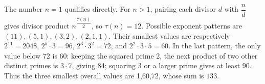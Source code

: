 The number $n=1$ qualifies directly. For $n>1$, pairing each divisor $d$ with $\dfrac{n}{d}$ gives divisor product $n^{\dfrac{\tau(n)}{2}}$, so $\tau(n)=12$. Possible exponent patterns are $(11),(5,1),(3,2),(2,1,1)$. Their smallest values are respectively $2^{11}=2048$, $2^5\cdot3=96$, $2^3\cdot3^2=72$, and $2^2\cdot3\cdot5=60$. In the last pattern, the only value below 72 is 60: keeping the squared prime 2, the next product of two other distinct primes is $3\cdot7$, giving 84; squaring 3 or a larger prime gives at least 90. Thus the three smallest overall values are 1,60,72, whose sum is $\boxed{133}$.
